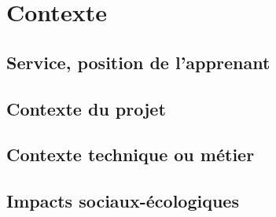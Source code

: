 \section{Contexte}

\subsection{Service, position de l'apprenant}

\subsection{Contexte du projet}

\subsection{Contexte technique ou métier}

\subsection{Impacts sociaux-écologiques}